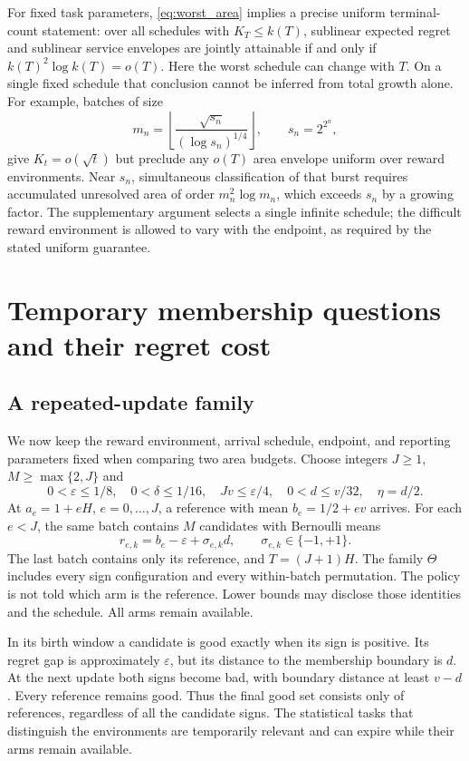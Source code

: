 \documentclass[11pt]{article}
\begin{document}
For fixed task parameters, \eqref{eq:worst_area} implies a precise uniform
terminal-count statement: over all schedules with $K_T\le k(T)$, sublinear
expected regret and sublinear service envelopes are jointly attainable if and
only if $k(T)^2\log k(T)=o(T)$. Here the worst schedule can change with $T$.
On a single fixed schedule that conclusion cannot be inferred from total
growth alone. For example, batches of size
\[
 m_n=\left\lfloor\frac{\sqrt{s_n}}{(\log s_n)^{1/4}}\right\rfloor,
 \qquad s_n=2^{2^n},
\]
give $K_t=o(\sqrt t)$ but preclude any $o(T)$ area envelope uniform over
reward environments. Near $s_n$, simultaneous classification of that burst
requires accumulated unresolved area of order $m_n^2\log m_n$, which exceeds
$s_n$ by a growing factor. The supplementary argument selects a single
infinite schedule; the difficult reward environment is allowed to vary with
the endpoint, as required by the stated uniform guarantee.
\section{Temporary membership questions and their regret cost}
\label{sec:tradeoff}

\subsection{A repeated-update family}

We now keep the reward environment, arrival schedule, endpoint, and reporting
parameters fixed when comparing two area budgets. Choose integers $J\ge1$,
$M\ge\max\{2,J\}$ and
\begin{equation}
 0<\varepsilon\le1/8,\quad 0<\delta\le1/16,\quad
 Jv\le\varepsilon/4,\quad 0<d\le v/32,\quad\eta=d/2.
 \label{eq:family_parameters}
\end{equation}
At $a_e=1+eH$, $e=0,\ldots,J$, a reference with mean $b_e=1/2+ev$
arrives. For each $e<J$, the same batch contains $M$ candidates with Bernoulli
means
\begin{equation}
 r_{e,k}=b_e-\varepsilon+\sigma_{e,k}d,
           \qquad \sigma_{e,k}\in\{-1,+1\}.
 \label{eq:family_means}
\end{equation}
The last batch contains only its reference, and $T=(J+1)H$. The family
$\Theta$ includes every sign configuration and every within-batch permutation.
The policy is not told which arm is the reference. Lower bounds may disclose
those identities and the schedule. All arms remain available.

In its birth window a candidate is good exactly when its sign is positive.
Its regret gap is approximately $\varepsilon$, but its distance to the
membership boundary is $d$. At the next update both signs become bad, with
boundary distance at least $v-d$. Every reference remains good. Thus the final
good set consists only of references, regardless of all the candidate signs.
The statistical tasks that distinguish the environments are temporarily
relevant and can expire while their arms remain available.
\end{document}
